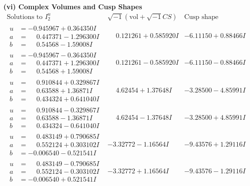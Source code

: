 \documentclass[1p]{elsarticle_modified}
\theoremstyle{definition}
\newcommand{\I}{\sqrt{-1}}
\begin{document}
\newpage\flushleft \textbf{(vi) Complex Volumes and Cusp Shapes}
$$\begin{array}{c|c|c}  
\text{Solutions to }I^u_{2}& \I (\text{vol} + \sqrt{-1}CS) & \text{Cusp shape}\\
 \hline 
\begin{aligned}
u &= -0.945967 + 0.364350 I \\
a &= \phantom{-}0.447371 - 1.296300 I \\
b &= \phantom{-}0.54568 - 1.59008 I\end{aligned}
 & \phantom{-}0.121261 + 0.585920 I & -6.11150 + 0.88466 I \\ \hline\begin{aligned}
u &= -0.945967 - 0.364350 I \\
a &= \phantom{-}0.447371 + 1.296300 I \\
b &= \phantom{-}0.54568 + 1.59008 I\end{aligned}
 & \phantom{-}0.121261 - 0.585920 I & -6.11150 - 0.88466 I \\ \hline\begin{aligned}
u &= \phantom{-}0.910844 + 0.329867 I \\
a &= \phantom{-}0.63588 + 1.36871 I \\
b &= \phantom{-}0.434324 + 0.641040 I\end{aligned}
 & \phantom{-}4.62454 + 1.37648 I & -3.28500 - 4.85991 I \\ \hline\begin{aligned}
u &= \phantom{-}0.910844 - 0.329867 I \\
a &= \phantom{-}0.63588 - 1.36871 I \\
b &= \phantom{-}0.434324 - 0.641040 I\end{aligned}
 & \phantom{-}4.62454 - 1.37648 I & -3.28500 + 4.85991 I \\ \hline\begin{aligned}
u &= \phantom{-}0.483149 + 0.790685 I \\
a &= \phantom{-}0.552124 + 0.303102 I \\
b &= -0.006540 - 0.521541 I\end{aligned}
 & -3.32772 - 1.16564 I & -9.43576 + 1.29116 I \\ \hline\begin{aligned}
u &= \phantom{-}0.483149 - 0.790685 I \\
a &= \phantom{-}0.552124 - 0.303102 I \\
b &= -0.006540 + 0.521541 I\end{aligned}
 & -3.32772 + 1.16564 I & -9.43576 - 1.29116 I \\ \hline\begin{aligned}

\end{aligned}
\end{array}$$
\end{document}
